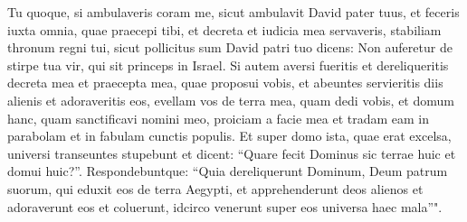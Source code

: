 \begin{biblechapter}
\verse Tu quoque, si ambulaveris coram me, sicut ambulavit David pater tuus, et feceris iuxta omnia, quae praecepi tibi, et decreta et iudicia mea servaveris, 
\verse stabiliam thronum regni tui, sicut pollicitus sum David patri tuo dicens: Non auferetur de stirpe tua vir, qui sit princeps in Israel. 
\verse Si autem aversi fueritis et dereliqueritis decreta mea et praecepta mea, quae proposui vobis, et abeuntes servieritis diis alienis et adoraveritis eos, 
\verse evellam vos de terra mea, quam dedi vobis, et domum hanc, quam sanctificavi nomini meo, proiciam a facie mea et tradam eam in parabolam et in fabulam cunctis populis.  
\verse Et super domo ista, quae erat excelsa, universi transeuntes stupebunt et dicent: “Quare fecit Dominus sic terrae huic et domui huic?”. 
\verse Respondebuntque: “Quia dereliquerunt Dominum, Deum patrum suorum, qui eduxit eos de terra Aegypti, et apprehenderunt deos alienos et adoraverunt eos et coluerunt, idcirco venerunt super eos universa haec mala”". 
\end{biblechapter}

